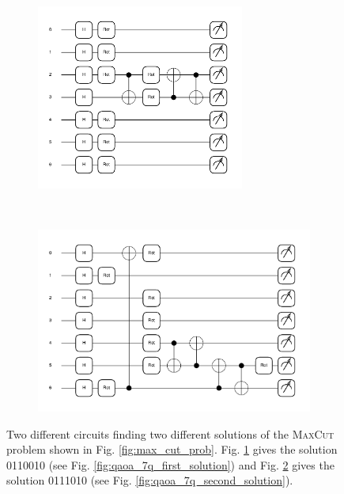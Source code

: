 \documentclass[a4paper,onecolumn,11pt]{quantumarticle}
\begin{document}
\begin{figure}[H]
    \centering
    \begin{subfigure}[b]{0.48\textwidth}
        \includegraphics[width=0.75\textwidth]{Figures/fig_qaoa_circ_7q_1.pdf}
        \caption{}
        \label{fig:qaoa_7q_first_circ}
    \end{subfigure}
    ~ %
    \begin{subfigure}[b]{0.48\textwidth}
        \includegraphics[width=\textwidth]{Figures/fig_qaoa_circ_7q_2.pdf}
        \caption{}
        \label{fig:qaoa_7q_second_circ}
    \end{subfigure}
    \caption{Two different circuits finding two different solutions of the \textsc{MaxCut} problem shown in Fig. \ref{fig:max_cut_prob}. Fig. \ref{fig:qaoa_7q_first_circ} gives the solution 0110010 (see Fig. \ref{fig:qaoa_7q_first_solution}) and Fig. \ref{fig:qaoa_7q_second_circ} gives the solution 0111010 (see Fig. \ref{fig:qaoa_7q_second_solution}).}\label{fig:qaoa_7q_circ}
\end{figure}
\end{document}

